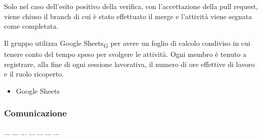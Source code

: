 Solo nel caso dell'esito positivo della verifica, con l'accettazione della pull request, viene chiuso il branch di cui è stato effettuato il merge e l'attività viene segnata come completata. 

Il gruppo utilizza Google Sheets\textsubscript{G} per avere un foglio di calcolo condiviso in cui tenere conto del tempo speso per svolgere le attività. Ogni membro è tenuto a registrare, alla fine di ogni sessione lavorativa, il numero di ore effettive di lavoro e il ruolo ricoperto.
    \begin{itemize}
        \item Google Sheets
    \end{itemize}


\subsubsection{Comunicazione}
...
... 
... 
... 
... 
... 
... 